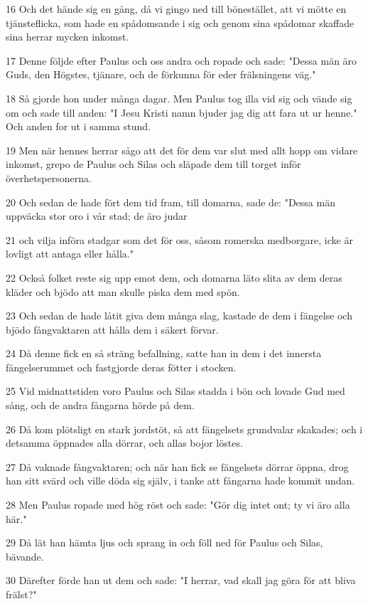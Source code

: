 \par 16 Och det hände sig en gång, då vi gingo ned till bönestället, att vi mötte en tjänsteflicka, som hade en spådomsande i sig och genom sina spådomar skaffade sina herrar mycken inkomst.
\par 17 Denne följde efter Paulus och oss andra och ropade och sade: "Dessa män äro Guds, den Högstes, tjänare, och de förkunna för eder frälsningens väg."
\par 18 Så gjorde hon under många dagar. Men Paulus tog illa vid sig och vände sig om och sade till anden: "I Jesu Kristi namn bjuder jag dig att fara ut ur henne." Och anden for ut i samma stund.
\par 19 Men när hennes herrar sågo att det för dem var slut med allt hopp om vidare inkomst, grepo de Paulus och Silas och släpade dem till torget inför överhetspersonerna.
\par 20 Och sedan de hade fört dem tid fram, till domarna, sade de: "Dessa män uppväcka stor oro i vår stad; de äro judar
\par 21 och vilja införa stadgar som det för oss, såsom romerska medborgare, icke är lovligt att antaga eller hålla."
\par 22 Också folket reste sig upp emot dem, och domarna läto slita av dem deras kläder och bjödo att man skulle piska dem med spön.
\par 23 Och sedan de hade låtit giva dem många slag, kastade de dem i fängelse och bjödo fångvaktaren att hålla dem i säkert förvar.
\par 24 Då denne fick en så sträng befallning, satte han in dem i det innersta fängelserummet och fastgjorde deras fötter i stocken.
\par 25 Vid midnattstiden voro Paulus och Silas stadda i bön och lovade Gud med sång, och de andra fångarna hörde på dem.
\par 26 Då kom plötsligt en stark jordstöt, så att fängelsets grundvalar skakades; och i detsamma öppnades alla dörrar, och allas bojor löstes.
\par 27 Då vaknade fångvaktaren; och när han fick se fängelsets dörrar öppna, drog han sitt svärd och ville döda sig själv, i tanke att fångarna hade kommit undan.
\par 28 Men Paulus ropade med hög röst och sade: "Gör dig intet ont; ty vi äro alla här."
\par 29 Då lät han hämta ljus och sprang in och föll ned för Paulus och Silas, bävande.
\par 30 Därefter förde han ut dem och sade: "I herrar, vad skall jag göra för att bliva frälst?"
